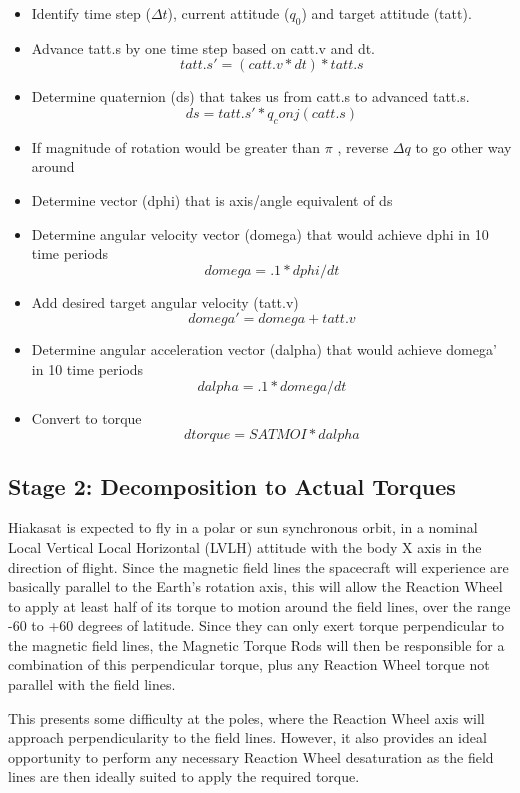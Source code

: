 \documentclass[12pt,letterpaper]{report}
\begin{document}
\begin{itemize}
\item Identify time step ($\Delta t$), current attitude ($q_{0}$) and target attitude (tatt).
\item Advance tatt.s by one time step based on catt.v and dt. \[tatt.s' = (catt.v * dt) * tatt.s\]
\item Determine quaternion (ds) that takes us from catt.s to advanced tatt.s. \[ds = tatt.s' * q_conj(catt.s)\]
\item If magnitude of rotation would be greater than $\pi$ , reverse $\Delta q$ to go other way around
\item Determine vector (dphi) that is axis/angle equivalent of ds
\item Determine angular velocity vector (domega) that would achieve dphi in 10 time periods \[domega = .1 * dphi / dt\]
\item Add desired target angular velocity (tatt.v) \[domega' = domega + tatt.v\]
\item Determine angular acceleration vector (dalpha) that would achieve domega' in 10 time periods \[dalpha = .1 * domega / dt\]
\item Convert to torque \[dtorque = SATMOI * dalpha\]
\end{itemize}

\subsection{Stage 2: Decomposition to Actual Torques}

Hiakasat is expected to fly in a polar or sun synchronous orbit, in a nominal Local Vertical Local Horizontal (LVLH) attitude with the body X axis in the direction of flight. Since the magnetic field lines the spacecraft will experience are basically parallel to the Earth's rotation axis, this will allow the Reaction Wheel to apply at least half of its torque to motion around the field lines, over the range -60 to +60 degrees of latitude. Since they can only exert torque perpendicular to the magnetic field lines, the Magnetic Torque Rods will then be responsible for a combination of this perpendicular torque, plus any Reaction Wheel torque not parallel with the field lines.

This presents some difficulty at the poles, where the Reaction Wheel axis will approach perpendicularity to the field lines. However, it also provides an ideal opportunity to perform any necessary Reaction Wheel desaturation as the field lines are then ideally suited to apply the required torque.
\end{document}
